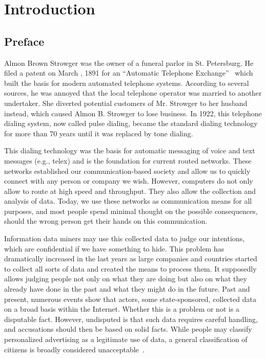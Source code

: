 


\part{Introduction}
\chapter{Preface}
Almon Brown Strowger was the owner of a funeral parlor in St. Petersburg. He filed a patent on March , 1891 for an ``Automatic Telephone Exchange''~\cite{pulseDialingPatent} which built the basis for modern automated telephone systems. According to several sources, he was annoyed that the local telephone operator was married to another undertaker. She diverted potential customers of Mr. Strowger to her husband instead, which caused Almon B. Strowger to lose business. In 1922, this telephone dialing system, now called pulse dialing, became the standard dialing technology for more than 70 years until it was replaced by tone dialing.

This dialing technology was the basis for automatic messaging of voice and text messages (e.g., telex) and is the foundation for current routed networks. These networks established our communication-based society and allow us to quickly connect with any person or company we wish. However, computers do not only allow to route at high speed and throughput. They also allow the collection and analysis of data. Today, we use these networks as communication means for all purposes, and most people spend minimal thought on the possible consequences, should the wrong person get their hands on this communication. 

Information data miners may use this collected data to judge our intentions, which are confidential if we have something to hide. This problem has dramatically increased in the last years as large companies and countries started to collect all sorts of data and created the means to process them. It supposedly allows judging people not only on what they are doing but also on what they already have done in the past and what they might do in the future. Past and present, numerous events show that actors, some state-sponsored, collected data on a broad basis within the Internet. Whether this is a problem or not is a disputable fact. However, undisputed is that such data requires careful handling, and accusations should then be based on solid facts. While people may classify personalized advertising as a legitimate use of data, a general classification of citizens is broadly considered unacceptable~\cite{NCR2013,XKeyscore,Ball2013,Greenberg2013,Leuenberger1989}.

